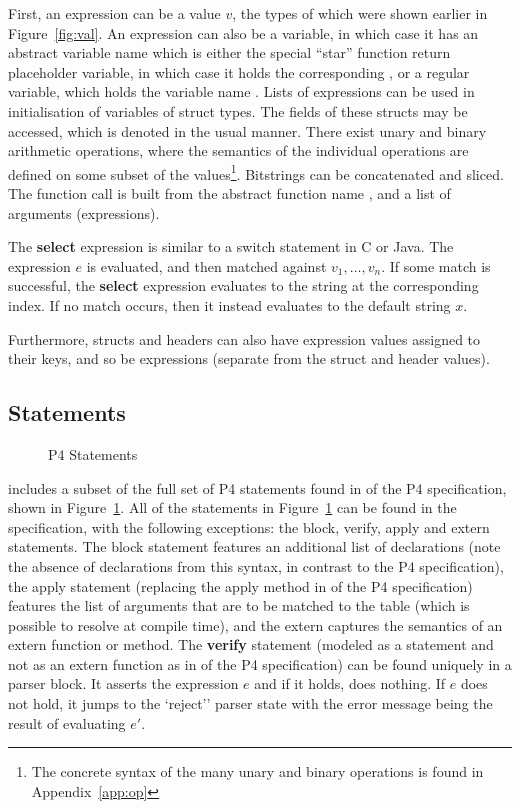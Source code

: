 \documentclass[UTF8]{article}
\begin{document}
First, an expression can be a value $v$, the types of which were shown earlier in Figure~\ref{fig:val}. An expression can also be a variable, in which case it has an abstract variable name \avn{} which is either the special ``star'' function return placeholder variable, in which case it holds the corresponding \funn{}, or a regular variable, which holds the variable name \vn{}. Lists of expressions can be used in initialisation of variables of struct types. The fields of these structs may be accessed, which is denoted in the usual manner. There exist unary and binary arithmetic operations, where the semantics of the individual operations are defined on some subset of the values\footnote{The concrete syntax of the many unary and binary operations is found in Appendix~\ref{app:op}}. Bitstrings can be concatenated and sliced. The function call is built from the abstract function name \funn{}, and a list of arguments (expressions).

The \textbf{select} expression is similar to a switch statement in C or Java. The expression $e$ is evaluated, and then matched against $v_1 , \ldots , v_n$. If some match is successful, the \textbf{select} expression evaluates to the string at the corresponding index. If no match occurs, then it instead evaluates to the default string $x$.

Furthermore, structs and headers can also have expression values assigned to their keys, and so be expressions (separate from the struct and header values).

\newcommand{\accept}{``accept''}
\newcommand{\reject}{`reject''}
\subsection{Statements} \label{ssec:stmt}

\begin{figure}[h!]
\centering\ottgrammartabular{
\ottstmt\ottafterlastrule
}
\caption{P4 Statements}
\label{fig:stmt}
\end{figure}

\pfott{} includes a subset of the full set of P4 statements found in  of the P4 specification, shown in Figure~\ref{fig:stmt}. All of the statements in Figure~\ref{fig:stmt} can be found in the specification, with the following exceptions: the block, verify, apply and extern statements. The block statement features an additional list of declarations (note the absence of declarations from this syntax, in contrast to the P4 specification), the apply statement (replacing the apply method in  of the P4 specification) features the list of arguments that are to be matched to the table \tn{} (which is possible to resolve at compile time), and the extern captures the semantics of an extern function or method. The \textbf{verify} statement (modeled as a statement and not as an extern function as in  of the P4 specification) can be found uniquely in a parser block. It asserts the expression $e$ and if it holds, does nothing. If $e$ does not hold, it jumps to the \reject{} parser state with the error message being the result of evaluating $e'$.
\end{document}
